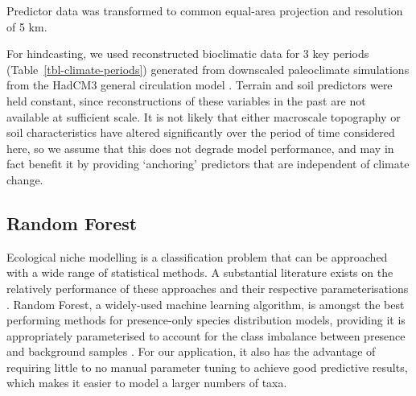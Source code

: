 \documentclass[
  authoryear,
  preprint]{elsarticle}
\begin{document}
Predictor data was transformed to common equal-area projection and
resolution of 5 km.

\begin{table}

\caption{\label{tbl-climate-periods}}


\end{table}%

For hindcasting, we used reconstructed bioclimatic data for 3 key
periods (Table~\ref{tbl-climate-periods}) generated from downscaled
paleoclimate simulations from the HadCM3 general circulation model
\citep{BrownEtAl2018}. Terrain and soil predictors were held constant,
since reconstructions of these variables in the past are not available
at sufficient scale. It is not likely that either macroscale topography
or soil characteristics have altered significantly over the period of
time considered here, so we assume that this does not degrade model
performance, and may in fact benefit it by providing `anchoring'
predictors that are independent of climate change.

\subsection{Random Forest}\label{random-forest}

Ecological niche modelling is a classification problem that can be
approached with a wide range of statistical methods. A substantial
literature exists on the relatively performance of these approaches and
their respective parameterisations \citep[reviewed
in][]{ValaviEtAl2022}. Random Forest, a widely-used machine learning
algorithm, is amongst the best performing methods for presence-only
species distribution models, providing it is appropriately parameterised
to account for the class imbalance between presence and background
samples \citep{ValaviEtAl2021, ValaviEtAl2022}. For our application, it
also has the advantage of requiring little to no manual parameter tuning
to achieve good predictive results, which makes it easier to model a
larger numbers of taxa.
\end{document}

